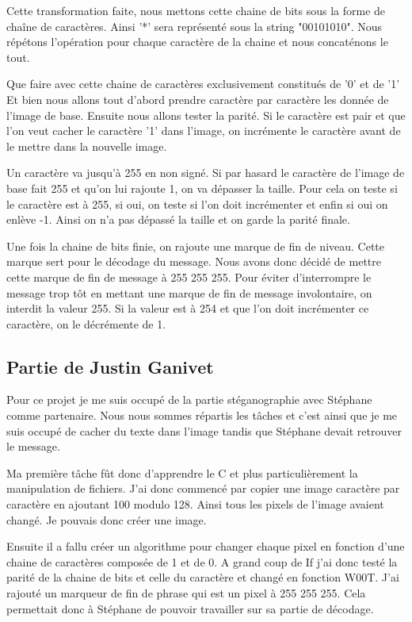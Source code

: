 \documentclass[a4paper,12pt]{article}
\begin{document}
Cette transformation faite, nous mettons cette chaine de bits sous la forme de chaîne de caractères. Ainsi '*' sera représenté sous la string "00101010". Nous répétons l'opération pour chaque caractère de la chaine et nous concaté\-nons le tout.

Que faire avec cette chaine de caractères exclusivement constitués de '0' et de '1' Et bien nous allons tout d'abord prendre caractère par caractère les donnée de l'image de base. Ensuite nous allons tester la parité. Si le caractère est pair et que l'on veut cacher le caractère '1' dans l'image, on incrémente le caractère avant de le mettre dans la nouvelle image.

Un caractère va jusqu’à 255 en non signé. Si par hasard le caractère de l'image de base fait 255 et qu'on lui rajoute 1, on va dépasser la taille. Pour cela on teste si le caractère est à 255, si oui, on teste si l'on doit incrémenter et enfin si oui on enlève -1. Ainsi on n’a pas dépassé la taille et on garde la parité finale.

Une fois la chaine de bits finie, on rajoute une marque de fin de niveau. Cette marque sert pour le décodage du message. Nous avons donc décidé de mettre cette marque de fin de message à 255 255 255. Pour éviter d'interrompre le message trop tôt en mettant une marque de fin de message involontaire, on interdit la valeur 255. Si la valeur est à 254 et que l'on doit incrémenter ce caractère, on le décrémente de 1.


\subsection{Partie de Justin Ganivet}

Pour ce projet je me suis occupé de la partie stéganographie avec Stéphane comme partenaire. Nous nous sommes répartis les tâches et c'est ainsi que je me suis occupé de cacher du texte dans l'image tandis que Stéphane devait retrouver le message.

Ma première tâche fût donc d'apprendre le C et plus particulièrement la manipulation de fichiers. J'ai donc commencé par copier une image caractère par caractère en ajoutant 100 modulo 128. Ainsi tous les pixels de l'image avaient changé. Je pouvais donc créer une image.

Ensuite il a fallu créer un algorithme pour changer chaque pixel en fonction d'une chaine de caractères composée de 1 et de 0. A grand coup de If j'ai donc testé la parité de la chaine de bits et celle du caractère et changé en fonction W00T. J'ai rajouté un marqueur de fin de phrase qui est un pixel à 255 255 255. Cela permettait donc à Stéphane de pouvoir travailler sur sa partie de décodage. 
\end{document}
